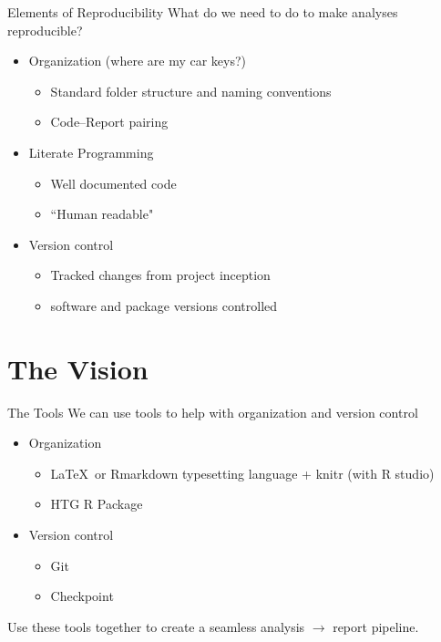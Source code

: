 \documentclass{beamer}\usepackage[]{graphicx}\usepackage[]{color}
\begin{document}
\begin{frame}{Elements of Reproducibility}
What do we need to do to make analyses reproducible?
\bigskip
\pause
\begin{itemize}
\item Organization (where are my car keys?)
\pause
  \begin{itemize}
  \item Standard folder structure and naming conventions
  \item Code--Report pairing
  \end{itemize}
\pause  
\bigskip
\item Literate Programming
  \begin{itemize}
  \item Well documented code
  \item ``Human readable"
  \end{itemize}
\pause
\bigskip
\item Version control
  \begin{itemize}
  \item Tracked changes from project inception
  \item software and package versions controlled
  \end{itemize}
\end{itemize}

\end{frame}

\section{The Vision}

\begin{frame}{The Tools}
We can use tools to help with organization and version control
\pause
\bigskip
\begin{itemize}
\item Organization 
  \begin{itemize}
  \item \LaTeX\ or Rmarkdown typesetting language + knitr (with R studio)
  \item HTG R Package
  \end{itemize}
\pause  

\bigskip
\item Version control
  \begin{itemize}
  \item Git
  \item Checkpoint
  \end{itemize}
\end{itemize}
\bigskip
\pause
Use these tools together to create a seamless analysis $\rightarrow$ report pipeline.\\

\end{frame}
\end{document}
